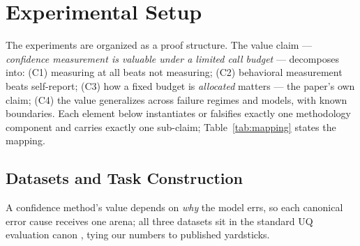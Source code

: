 \documentclass[11pt]{article}
\begin{document}
\section{Experimental Setup}
\label{sec:exp}

The experiments are organized as a proof structure. The value claim
--- \emph{confidence measurement is valuable under a limited call
budget} --- decomposes into: (C1) measuring at all beats not
measuring; (C2) behavioral measurement beats self-report; (C3) how a
fixed budget is \emph{allocated} matters --- the paper's own claim;
(C4) the value generalizes across failure regimes and models, with
known boundaries. Each element below instantiates or falsifies exactly
one methodology component and carries exactly one sub-claim;
Table~\ref{tab:mapping} states the mapping.

\subsection{Datasets and Task Construction}
\label{sec:exp:data}

A confidence method's value depends on \emph{why} the model errs, so
each canonical error cause receives one arena; all three datasets sit
in the standard UQ evaluation canon
\citep{kuhn2023,farquhar2024,tian2023,vashurin2025}, tying our numbers
to published yardsticks.
\end{document}
